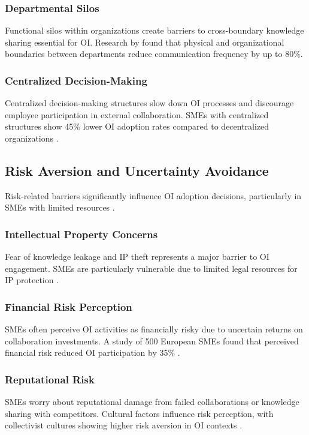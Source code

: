 \subsubsection{Departmental Silos}
Functional silos within organizations create barriers to cross-boundary knowledge sharing essential for OI. Research by \cite{allen1977managing} found that physical and organizational boundaries between departments reduce communication frequency by up to 80\%.

\subsubsection{Centralized Decision-Making}
Centralized decision-making structures slow down OI processes and discourage employee participation in external collaboration. SMEs with centralized structures show 45\% lower OI adoption rates compared to decentralized organizations \citep{foss2013governing}.

\subsection{Risk Aversion and Uncertainty Avoidance}

Risk-related barriers significantly influence OI adoption decisions, particularly in SMEs with limited resources \citep{ahrweiler2017innovation}.

\subsubsection{Intellectual Property Concerns}
Fear of knowledge leakage and IP theft represents a major barrier to OI engagement. SMEs are particularly vulnerable due to limited legal resources for IP protection \citep{alexy2009custody}.

\subsubsection{Financial Risk Perception}
SMEs often perceive OI activities as financially risky due to uncertain returns on collaboration investments. A study of 500 European SMEs found that perceived financial risk reduced OI participation by 35\% \citep{spithoven2013networks}.

\subsubsection{Reputational Risk}
SMEs worry about reputational damage from failed collaborations or knowledge sharing with competitors. Cultural factors influence risk perception, with collectivist cultures showing higher risk aversion in OI contexts \citep{hofstede1980cultures}.

